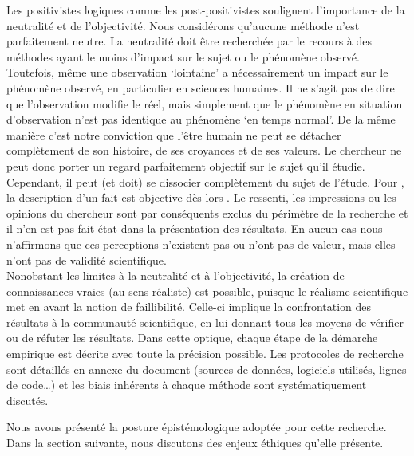     Les positivistes logiques comme les post-positivistes soulignent l’importance de la neutralité et de l’objectivité. Nous considérons qu’aucune méthode n’est parfaitement neutre. La neutralité doit être recherchée par le recours à des méthodes ayant le moins d’impact sur le sujet ou le phénomène observé. Toutefois, même une observation ‘lointaine’ a nécessairement un impact sur le phénomène observé, en particulier en sciences humaines. Il ne s’agit pas de dire que l’observation modifie le réel, mais simplement que le phénomène en situation d’observation n’est pas identique au phénomène ‘en temps normal’. De la même manière c’est notre conviction que l’être humain ne peut se détacher complètement de son histoire, de ses croyances et de ses valeurs. Le chercheur ne peut donc porter un regard parfaitement objectif sur le sujet qu’il étudie. Cependant, il peut (et doit) se dissocier complètement du sujet de l’étude.  Pour \textcite[][p.209]{bunge1993realism}, la description d’un fait est objective dès lors . Le ressenti, les impressions ou les opinions du chercheur sont par conséquents exclus du périmètre de la recherche et il n’en est pas fait état dans la présentation des résultats. En aucun cas nous n’affirmons que ces perceptions n’existent pas ou n’ont pas de valeur, mais elles n’ont pas de validité scientifique. \\
    
    Nonobstant les limites à la neutralité et à l’objectivité, la création de connaissances vraies (au sens réaliste) est possible, puisque le réalisme scientifique met en avant la notion de faillibilité. Celle-ci implique la confrontation des résultats à la communauté scientifique, en lui donnant tous les moyens de vérifier ou de réfuter les résultats. Dans cette optique, chaque étape de la démarche empirique est décrite avec toute la précision possible. Les protocoles de recherche sont détaillés en annexe du document (sources de données, logiciels utilisés, lignes de code…) et les biais inhérents à chaque méthode sont systématiquement discutés. 


\transition
    Nous avons présenté la posture épistémologique adoptée pour cette recherche. Dans la section suivante, nous discutons des enjeux éthiques qu'elle présente. 